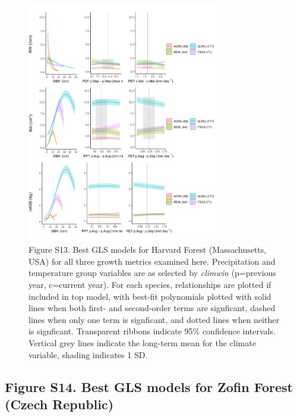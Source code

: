 \documentclass[
]{article}
\begin{document}
\begin{figure}
\centering
\includegraphics[width=0.75\textwidth,height=\textheight]{tables_figures/SI_figures/composite_plots/HarvardForest.png}
\caption{Figure S13. Best GLS models for Harvard Forest (Massachusetts,
USA) for all three growth metrics examined here. Precipitation and
temperature group variables are as selected by \emph{climwin}
(p=previous year, c=current year). For each species, relationships are
plotted if included in top model, with best-fit polynomials plotted with
solid lines when both first- and second-order terms are signficant,
dashed lines when only one term is signficant, and dotted lines when
neither is signficant. Transparent ribbons indicate 95\% confidence
intervals. Vertical grey lines indicate the long-term mean for the
climate variable, shading indicates 1 SD.}
\end{figure}

\newpage

\hypertarget{figure-s14.-best-gls-models-for-zofin-forest-czech-republic}{%
\subsection{Figure S14. Best GLS models for Zofin Forest (Czech
Republic)}\label{figure-s14.-best-gls-models-for-zofin-forest-czech-republic}}
\end{document}
